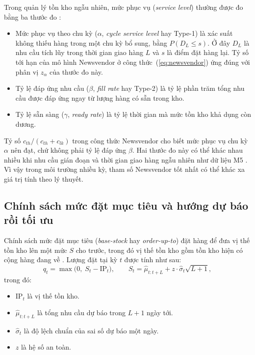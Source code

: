 Trong quản lý tồn kho ngẫu nhiên, mức phục vụ (\textit{service level}) thường được đo bằng ba thước đo \parencite{silver2016, zipkin2000}:
\begin{itemize}
    \item Mức phục vụ theo chu kỳ ($\alpha$, \textit{cycle service level} hay Type-1) là xác suất không thiếu hàng trong một chu kỳ bổ sung, bằng $P(D_L \le s)$. Ở đây $D_L$ là nhu cầu tích lũy trong thời gian giao hàng $L$ và $s$ là điểm đặt hàng lại. Tỷ số tới hạn của mô hình Newsvendor ở công thức~(\ref{eq:newsvendor}) ứng đúng với phân vị $z_\alpha$ của thước đo này.
    \item Tỷ lệ đáp ứng nhu cầu ($\beta$, \textit{fill rate} hay Type-2) là tỷ lệ phần trăm tổng nhu cầu được đáp ứng ngay từ lượng hàng có sẵn trong kho.
    \item Tỷ lệ sẵn sàng ($\gamma$, \textit{ready rate}) là tỷ lệ thời gian mà mức tồn kho khả dụng còn dương.
\end{itemize}

Tỷ số $c_{th}/(c_{th} + c_{lk})$ trong công thức Newsvendor cho biết mức phục vụ chu kỳ $\alpha$ nên đạt, chứ không phải tỷ lệ đáp ứng $\beta$. Hai thước đo này có thể khác nhau nhiều khi nhu cầu gián đoạn và thời gian giao hàng ngẫu nhiên như dữ liệu M5 \parencite{silver2016}. Vì vậy trong môi trường nhiều kỳ, tham số Newsvendor tốt nhất có thể khác xa giá trị tính theo lý thuyết.

\subsection{Chính sách mức đặt mục tiêu và hướng dự báo rồi tối ưu}
\label{subsec:duBaoToiUu}

Chính sách mức đặt mục tiêu (\textit{base-stock} hay \textit{order-up-to}) đặt hàng để đưa vị thế tồn kho lên một mức $S$ cho trước, trong đó vị thế tồn kho gồm tồn kho hiện có cộng hàng đang về \parencite{zipkin2000}. Lượng đặt tại kỳ $t$ được tính như sau:
\begin{equation}
    q_t = \max\bigl(0,\; S_t - \text{IP}_t\bigr),
    \qquad
    S_t = \hat{\mu}_{t:t+L} + z \cdot \hat{\sigma}_{t} \sqrt{L + 1},
    \label{eq:baseStock}
\end{equation}
trong đó:
\begin{itemize}
    \item $\text{IP}_t$ là vị thế tồn kho.
    \item $\hat{\mu}_{t:t+L}$ là tổng nhu cầu dự báo trong $L + 1$ ngày tới.
    \item $\hat{\sigma}_{t}$ là độ lệch chuẩn của sai số dự báo một ngày.
    \item $z$ là hệ số an toàn.
\end{itemize}

